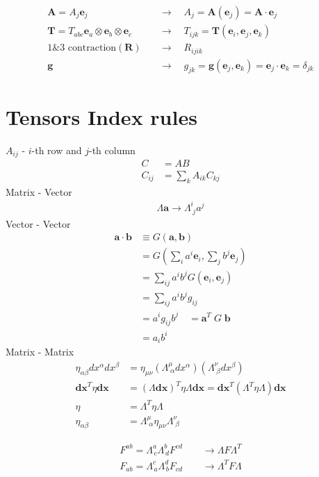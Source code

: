 \documentclass[10pt,a4paper]{book}
\theoremstyle{definition}
\begin{document}
\begin{itemize}
\begin{align}
    \mathbf{A}=A_j\mathbf{e}_j\quad&\rightarrow\quad A_j=\mathbf{A}(\mathbf{e}_j)=\mathbf{A}\cdot\mathbf{e}_j\\
    \mathbf{T}=T_{abc}\mathbf{e}_a\otimes\mathbf{e}_b\otimes\mathbf{e}_c\quad&\rightarrow\quad T_{ijk}=\mathbf{T}(\mathbf{e}_i,\mathbf{e}_j,\mathbf{e}_k)\\
    \text{1\&3 contraction}(\mathbf{R})\quad&\rightarrow\quad R_{ijik}\\
    \mathbf{g}\quad&\rightarrow\quad g_{jk}=\mathbf{g}(\mathbf{e}_j,\mathbf{e}_k)=\mathbf{e}_j\cdot\mathbf{e}_k=\delta_{jk}
\end{align}
\end{itemize}

\section{Tensors Index rules}
$A_{ij}$ - $i$-th row and $j$-th column
\begin{align}
C&=AB\\
C_{ij}&=\sum_kA_{ik}C_{kj}
\end{align}
Matrix - Vector
\begin{align}
\Lambda\mathbf{a}\rightarrow \Lambda^i_{\;j}a^j
\end{align}
Vector - Vector
\begin{align}
\mathbf{a}\cdot\mathbf{b}&\equiv G(\mathbf{a},\mathbf{b})\\
&=G(\sum_i a^i\mathbf{e}_i,\sum_j b^j\mathbf{e}_j)\\
&=\sum_{ij}a^ib^jG(\mathbf{e}_i,\mathbf{e}_j)\\
&=\sum_{ij}a^ib^jg_{ij}\\
&=a^i g_{ij} b^j\quad=\mathbf{a}^T\;G\;\mathbf{b}\\
&=a_i b^i
\end{align}
Matrix - Matrix
\begin{align}
\eta_{\alpha\beta}dx^\alpha dx^\beta&=\eta_{\mu\nu}(\Lambda^\mu_{\;\alpha}dx^\alpha)(\Lambda^\nu_{\;\beta}dx^\beta)\\
\mathbf{dx}^T\eta\mathbf{dx}&=(\Lambda\mathbf{dx})^T\eta\Lambda \mathbf{dx}=\mathbf{dx}^T(\Lambda^T\eta\Lambda)\mathbf{dx}\\
\eta&=\Lambda^T\eta\Lambda\\
\eta_{\alpha\beta}&=\Lambda^\mu_{\;\alpha}\eta_{\mu\nu}\Lambda^\nu_{\;\beta}
\end{align}

\begin{align}
F^{ab}=\Lambda^a_{\,c}\Lambda^b_{\,d} F^{cd}\qquad\rightarrow\Lambda F\Lambda^T\\
F_{ab}=\Lambda^c_{\,a}\Lambda^d_{\,b} F_{cd}\qquad\rightarrow\Lambda^T F\Lambda
\end{align}
\end{document}
